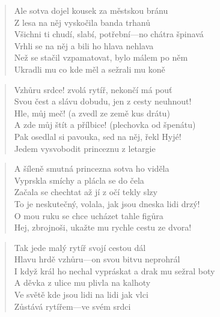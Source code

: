 \begin{song}{}
\begin{verse}
   Ale sotva dojel kousek za městskou bránu \\
   Z lesa na něj vyskočila banda trhanů \\
   Všichni ti chudí, slabí, potřební---no chátra špinavá \\
   Vrhli se na něj a bili ho hlava nehlava \\
   Než se stačil vzpamatovat, bylo málem po něm \\
   Ukradli mu co kde měl a sežrali mu koně
\end{verse}
\begin{verse}
   Vzhůru srdce! zvolá rytíř, nekončí má pouť \\
   Svou čest a slávu dobudu, jen z cesty neuhnout! \\
   Hle, můj meč! (a zvedl ze země kus drátu) \\
   A zde můj štít a přílbice! (plechovka od špenátu) \\
   Pak osedlal si pavouka, sed na něj, řekl Hyjé! \\
   Jedem vysvobodit princeznu z letargie
\end{verse}
\begin{verse}
   A šíleně smutná princezna sotva ho viděla \\
   Vyprskla smíchy a plácla se do čela \\
   Začala se chechtat až jí z očí tekly slzy \\
   To je neskutečný, volala, jak jsou dneska lidi drzý! \\
   O mou ruku se chce ucházet tahle figůra \\
   Hej, zbrojnoši, ukažte mu rychle cestu ze dvora!
\end{verse}
\begin{verse}
   Tak jede malý rytíř svojí cestou dál \\
   Hlavu hrdě vzhůru---on svou bitvu neprohrál \\
   I když král ho nechal vypráskat a drak mu sežral boty \\
   A děvka z ulice mu plivla na kalhoty \\
   Ve světě kde jsou lidi na lidi jak vlci \\
   Zůstává rytířem---ve svém srdci
\end{verse}
\end{song}
\pagebreak
